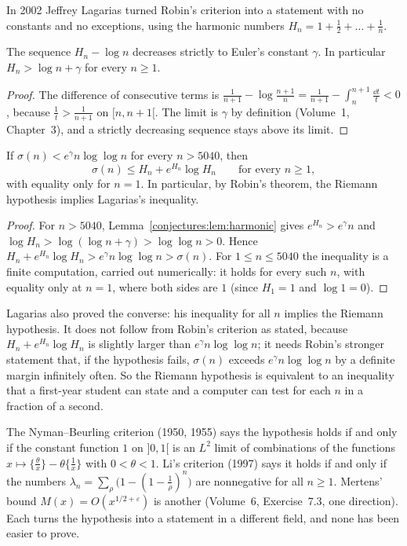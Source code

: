 In 2002 Jeffrey Lagarias turned Robin's criterion into a statement with no constants and no exceptions, using the harmonic numbers
$H_n=1+\frac12+\dots+\frac1n$.

\begin{lemma}\label{conjectures:lem:harmonic}
The sequence $H_n-\log n$ decreases strictly to Euler's constant $\gamma$. In particular $H_n>\log n+\gamma$ for every $n\ge1$.
\end{lemma}
\begin{proof}
The difference of consecutive terms is $\frac1{n+1}-\log\frac{n+1}n=\frac1{n+1}-\int_n^{n+1}\frac{\dd t}t<0$, because $\frac1t>\frac1{n+1}$ on $[n,n+1[$. The limit is $\gamma$
by definition (Volume~1, Chapter~3), and a strictly decreasing sequence stays above its limit.
\end{proof}

\begin{proposition}\label{conjectures:prop:lagarias}
If $\sigma(n)<e^\gamma n\log\log n$ for every $n>5040$, then
\[
\sigma(n)\le H_n+e^{H_n}\log H_n\qquad\text{for every }n\ge1,
\]
with equality only for $n=1$. In particular, by Robin's theorem, the Riemann hypothesis implies Lagarias's inequality.
\end{proposition}
\begin{proof}
For $n>5040$, Lemma~\ref{conjectures:lem:harmonic} gives $e^{H_n}>e^\gamma n$ and $\log H_n>\log(\log n+\gamma)>\log\log n>0$. Hence
$H_n+e^{H_n}\log H_n>e^\gamma n\log\log n>\sigma(n)$. For $1\le n\le5040$ the inequality is a finite computation, carried out numerically: it holds
for every such $n$, with equality only at $n=1$, where both sides are $1$ (since $H_1=1$ and $\log1=0$).
\end{proof}

Lagarias also proved the converse: his inequality for all $n$ implies the Riemann hypothesis. It does not follow from Robin's criterion as stated,
because $H_n+e^{H_n}\log H_n$ is slightly larger than $e^\gamma n\log\log n$; it needs Robin's stronger statement that, if the hypothesis fails,
$\sigma(n)$ exceeds $e^\gamma n\log\log n$ by a definite margin infinitely often. So the Riemann hypothesis is equivalent to an inequality that a
first-year student can state and a computer can test for each $n$ in a fraction of a second.

\begin{remark}
The Nyman--Beurling criterion (1950, 1955) says the hypothesis holds if and only if the constant function $1$ on $]0,1[$ is an $L^2$ limit of
combinations of the functions $x\mapsto\{\frac\theta x\}-\theta\{\frac1x\}$ with $0<\theta<1$. Li's criterion (1997) says it holds if and only if the numbers
$\lambda_n=\sum_\rho\bigl(1-(1-\frac1\rho)^n\bigr)$ are nonnegative for all $n\ge1$. Mertens' bound $M(x)=O(x^{1/2+\varepsilon})$ is another (Volume~6,
Exercise~7.3, one direction). Each turns the hypothesis into a statement in a different field, and none has been easier to prove.
\end{remark}

